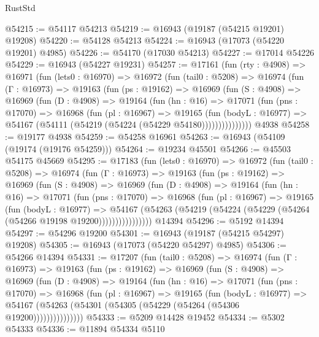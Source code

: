\begin{lexlean}{RustStd}
\begin{coremodule}
@54215 := @54117 @54213
@54219 := @16943 (@19187 (@54215 @19201) @19208)
@54220 := @54128 @54213
@54224 := @16943 (@17073 (@54220 @19201) @4985)
@54226 := @54170 (@17030 @54213)
@54227 := @17014 @54226
@54229 := @16943 (@54227 @19231)
@54257 := @17161
    (fun (rty : @4908) =>
    @16971
      (fun (lets0 : @16970) =>
      @16972
        (fun (tail0 : @5208) =>
        @16974
          (fun (Γ : @16973) =>
          @19163
            (fun (ps : @19162) =>
            @16969
              (fun (S : @4908) =>
              @16969
                (fun (D : @4908) =>
                @19164
                  (fun (hn : @16) =>
                  @17071
                    (fun (pns : @17070) =>
                    @16968
                      (fun (pl : @16967) =>
                      @19165
                        (fun (bodyL : @16977) =>
                        @54167 (@54111 (@54219 (@54224 (@54229 @54180)))))))))))))))
    @4938
@54258 := @19177 @4938
@54259 := @54258 @16961
@54263 := @16943 (@54109 (@19174 (@19176 @54259)))
@54264 := @19234 @45501
@54266 := @45503 @54175 @45669
@54295 := @17183
    (fun (lets0 : @16970) =>
    @16972
      (fun (tail0 : @5208) =>
      @16974
        (fun (Γ : @16973) =>
        @19163
          (fun (ps : @19162) =>
          @16969
            (fun (S : @4908) =>
            @16969
              (fun (D : @4908) =>
              @19164
                (fun (hn : @16) =>
                @17071
                  (fun (pns : @17070) =>
                  @16968
                    (fun (pl : @16967) =>
                    @19165
                      (fun (bodyL : @16977) =>
                      @54167
                        (@54263
                          (@54219 (@54224 (@54229 (@54264 (@54266 @19198 @19200))))))))))))))))
    @14394
@54296 := @5192 @14394
@54297 := @54296 @19200
@54301 := @16943 (@19187 (@54215 @54297) @19208)
@54305 := @16943 (@17073 (@54220 @54297) @4985)
@54306 := @54266 @14394
@54331 := @17207
    (fun (tail0 : @5208) =>
    @16974
      (fun (Γ : @16973) =>
      @19163
        (fun (ps : @19162) =>
        @16969
          (fun (S : @4908) =>
          @16969
            (fun (D : @4908) =>
            @19164
              (fun (hn : @16) =>
              @17071
                (fun (pns : @17070) =>
                @16968
                  (fun (pl : @16967) =>
                  @19165
                    (fun (bodyL : @16977) =>
                    @54167 (@54263 (@54301 (@54305 (@54229 (@54264 (@54306 @19200)))))))))))))))
@54333 := @5209 @14428 @19452
@54334 := @5302 @54333
@54336 := @11894 @54334 @5110

\end{coremodule}
\end{lexlean}
